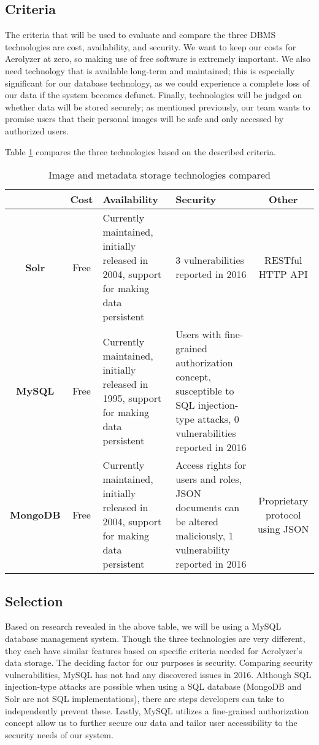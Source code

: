 \documentclass[letterpaper,10pt,draftclsnofoot,onecolumn]{IEEEtran}
\begin{document}
\begin{flushleft}
\subsection{Criteria}
The criteria that will be used to evaluate and compare the three DBMS technologies are cost, availability, and security. We want to keep our costs for Aerolyzer at zero, so making use of free software is extremely important. We also need technology that is available long-term and maintained; this is especially significant for our database technology, as we could experience a complete loss of our data if the system becomes defunct. Finally, technologies will be judged on whether data will be stored securely; as mentioned previously, our team wants to promise users that their personal images will be safe and only accessed by authorized users. 

\medskip

Table \ref{table:1} compares the three technologies based on the described criteria. \cite{8} \cite{9}
\begin{table}[h!]
\caption{Image and metadata storage technologies compared}\label{table:1}
\centering
	\begin{tabular}{| c | c |  p{5cm}  |  p{5cm}  | c |} 
		\hline
		 & Cost & Availability & Security & Other \\ [0.5ex] 
		\hline
		\textbf{Solr} & Free & Currently maintained, initially released in 2004, support for making data persistent & 3 vulnerabilities reported in 2016 & RESTful HTTP API \\ 
		\hline
		\textbf{MySQL} & Free & Currently maintained, initially released in 1995, support for making data persistent & Users with fine-grained authorization concept, susceptible to SQL injection-type attacks, 0 vulnerabilities reported in 2016 & \\
		\hline
		\textbf{MongoDB} & Free & Currently maintained, initially released in 2004, support for making data persistent & Access rights for users and roles, JSON documents can be altered maliciously, 1 vulnerability reported in 2016 & Proprietary protocol using JSON \\
		\hline
	\end{tabular}
\end{table}



\subsection{Selection}
Based on research revealed in the above table, we will be using a MySQL database management system. Though the three technologies are very different, they each have similar features based on specific criteria needed for Aerolyzer's data storage. The deciding factor for our purposes is security. Comparing security vulnerabilities, MySQL has not had any discovered issues in 2016. Although SQL injection-type attacks are possible when using a SQL database (MongoDB and Solr are not SQL implementations), there are steps developers can take to independently prevent these. Lastly, MySQL utilizes a fine-grained authorization concept allow us to further secure our data and tailor user accessibility to the security needs of our system.



\end{flushleft}
\end{document}
